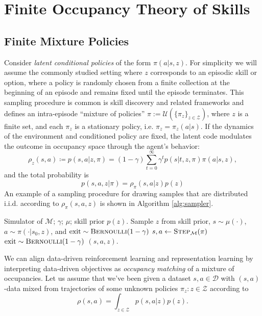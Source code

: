 \documentclass{article}
\theoremstyle{plain}
\theoremstyle{definition}
\theoremstyle{remark}
\begin{document}
\section{Finite Occupancy Theory of Skills}
\subsection{Finite Mixture Policies}
Consider \emph{latent conditional policies} of the form $\pi(a|s,z)$. 
For simplicity we will assume the commonly studied setting where $z$ corresponds to an episodic skill or option, where a policy is randomly chosen from a finite collection at the beginning of an episode and remains fixed until the episode terminates. 
This sampling procedure is common is skill discovery and related frameworks and defines an intra-episode ``mixture of policies'' $\pi := \mathcal{U}(\{\pi_z\}_{z\in \mathcal{Z}})$, where $z$ is a finite set, and each $\pi_z$ is a stationary policy, i.e. $\pi_z = \pi_z(a|s)$.
If the dynamics of the environment and conditioned policy are fixed, the latent code modulates the outcome in occupancy space through the agent's behavior: 
\begin{equation}
    \rho_z(s,a) \coloneqq p(s,a|z,\pi) = (1-\gamma)
    \sum_{t=0}^\infty \gamma^t p(s|t, z, \pi) \pi(a|s,z),
\end{equation}
and the total probability is
$$p(s,a,z|\pi) =  \rho_\pi(s,a|z)p(z)$$
An example of a sampling procedure for drawing samples that are distributed i.i.d. according to $\rho_\pi(s,a,z)$ is shown in Algorithm \ref{alg:sampler}.
\begin{algorithm}
\caption{Generative process for $s, a, z \sim d_\pi$ (adapted from \citep{agarwal2021theory}).}
\label{alg:sampler}
\begin{algorithmic}[1]
\REQUIRE Simulator of $\mathcal{M}$; $\gamma$; $\mu$; skill prior $p(z)$.
\STATE Sample $z$ from skill prior, $s \sim \mu(\cdot)$, $a \sim \pi(\cdot|s_0, z)$, and $\mathrm{exit} \sim \textsc{Bernoulli}(1-\gamma)$
    \STATE $s,a \gets \textsc{Step}_\mathcal{M}(\pi)$
    \STATE $\mathrm{exit} \sim \textsc{Bernoulli}(1-\gamma)$
\ENDWHILE
\RETURN $(s, a, z)$.
\end{algorithmic}
\end{algorithm}
We can align data-driven reinforcement learning and representation learning by interpreting data-driven objectives as \emph{occupancy matching} of a mixture of occupancies.
Let us assume that we've been given a dataset ${s, a} \in \mathcal{D}$ with $(s,a)$-data mixed from trajectories of some unknown policies ${\pi_z : z \in\mathcal{Z}}$ according to 
\begin{equation}
    \rho(s,a) = \int_{z\in \mathcal{Z}} p(s,a|z)p(z).
\end{equation}
\end{document}
